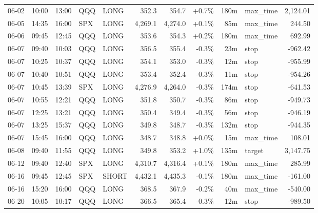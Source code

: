 \documentclass[11pt,a4paper,twoside]{article}
\begin{document}
\begin{center}
\begin{longtable}{>{\color{txtmain}}l l l l l r r r r >{\color{txtmain}}l r}
06-02 & 10:00 & 13:00 & QQQ & LONG & 352.3 & 354.7 & \textcolor{wingreen}{+0.7\%} & 180m & max\_time & \textcolor{wingreen}{2,124.01} \\
06-05 & 14:35 & 16:00 & SPX & LONG & 4,269.1 & 4,274.0 & \textcolor{wingreen}{+0.1\%} & 85m & max\_time & \textcolor{wingreen}{244.50} \\
06-06 & 09:45 & 12:45 & QQQ & LONG & 353.6 & 354.3 & \textcolor{wingreen}{+0.2\%} & 180m & max\_time & \textcolor{wingreen}{692.99} \\
06-07 & 09:40 & 10:03 & QQQ & LONG & 356.5 & 355.4 & \textcolor{lossred}{-0.3\%} & 23m & stop & \textcolor{lossred}{-962.42} \\
06-07 & 10:25 & 10:37 & QQQ & LONG & 354.1 & 353.0 & \textcolor{lossred}{-0.3\%} & 12m & stop & \textcolor{lossred}{-955.99} \\
06-07 & 10:40 & 10:51 & QQQ & LONG & 353.4 & 352.4 & \textcolor{lossred}{-0.3\%} & 11m & stop & \textcolor{lossred}{-954.26} \\
06-07 & 10:45 & 13:39 & SPX & LONG & 4,276.9 & 4,264.0 & \textcolor{lossred}{-0.3\%} & 174m & stop & \textcolor{lossred}{-641.53} \\
06-07 & 10:55 & 12:21 & QQQ & LONG & 351.8 & 350.7 & \textcolor{lossred}{-0.3\%} & 86m & stop & \textcolor{lossred}{-949.73} \\
06-07 & 12:25 & 13:21 & QQQ & LONG & 350.4 & 349.4 & \textcolor{lossred}{-0.3\%} & 56m & stop & \textcolor{lossred}{-946.19} \\
06-07 & 13:25 & 15:37 & QQQ & LONG & 349.8 & 348.7 & \textcolor{lossred}{-0.3\%} & 132m & stop & \textcolor{lossred}{-944.35} \\
06-07 & 15:45 & 16:00 & QQQ & LONG & 348.7 & 348.8 & \textcolor{wingreen}{+0.0\%} & 15m & max\_time & \textcolor{wingreen}{108.01} \\
06-08 & 09:40 & 11:55 & QQQ & LONG & 349.8 & 353.2 & \textcolor{wingreen}{+1.0\%} & 135m & target & \textcolor{wingreen}{3,147.75} \\
06-12 & 09:40 & 12:40 & SPX & LONG & 4,310.7 & 4,316.4 & \textcolor{wingreen}{+0.1\%} & 180m & max\_time & \textcolor{wingreen}{285.99} \\
06-16 & 09:45 & 12:45 & SPX & SHORT & 4,432.1 & 4,435.3 & \textcolor{lossred}{-0.1\%} & 180m & max\_time & \textcolor{lossred}{-161.00} \\
06-16 & 15:20 & 16:00 & QQQ & LONG & 368.5 & 367.9 & \textcolor{lossred}{-0.2\%} & 40m & max\_time & \textcolor{lossred}{-540.00} \\
06-20 & 10:05 & 10:17 & QQQ & LONG & 366.5 & 365.4 & \textcolor{lossred}{-0.3\%} & 12m & stop & \textcolor{lossred}{-989.50} \\

\end{longtable}
\end{center}
\end{document}
